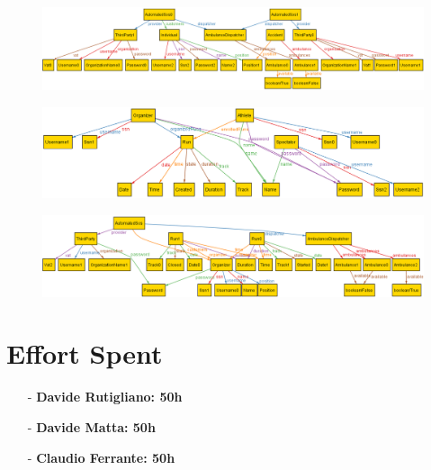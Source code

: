 \documentclass[a4paper]{article}
\begin{document}
    
    \begin{figure}[!ht]
    	\centering
    	\includegraphics[width=\textwidth]{RASD/images/alloy/automatedSOS.png}
    \end{figure}
    
    \begin{figure}[!ht]
    	\centering
    	\includegraphics[width=\textwidth]{RASD/images/alloy/track4Run.png}
    \end{figure}
    
    \newpage
    
    \begin{figure}[!ht]
    	\centering
    	\includegraphics[width=0.91\paperwidth, angle=90]{RASD/images/alloy/showAll.png}
    \end{figure}
\section{Effort Spent}
    \begin{itemize}
        \item[-] \textbf{Davide Rutigliano: 50h}
        
        \item[-] \textbf{Davide Matta: 50h}
        
        \item[-] \textbf{Claudio Ferrante: 50h}
    \end{itemize}
\end{document}
